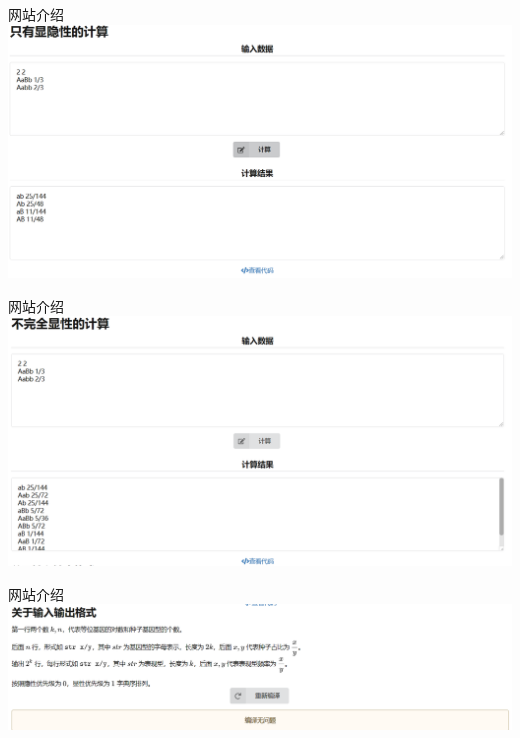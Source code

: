 \documentclass{beamer}
\begin{document}
	\begin{frame}{网站介绍}
		\centering \includegraphics[scale=0.5]{show1.png}
	\end{frame}

	\begin{frame}{网站介绍}
		\centering \includegraphics[scale=0.5]{show2.png}
	\end{frame}

	\begin{frame}{网站介绍}
		\centering \includegraphics[scale=0.5]{show3.png}
	\end{frame}
\end{document}
